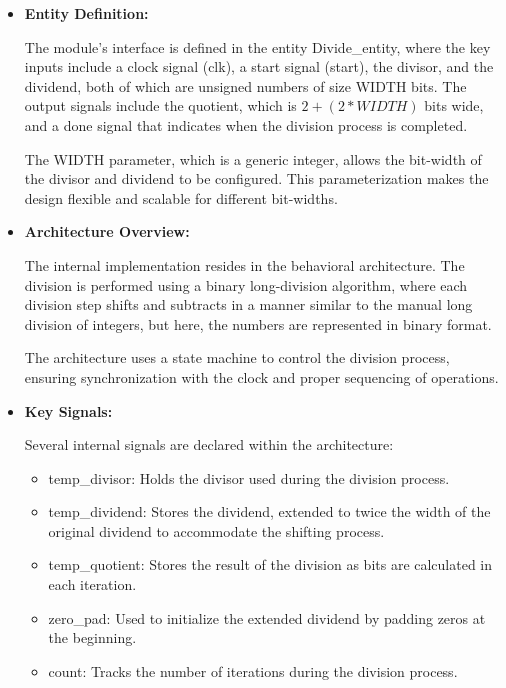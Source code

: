 \begin{itemize}
\item[$\rightarrow$]\textbf{Entity Definition:}

The module's interface is defined in the entity Divide\_entity, where the key inputs include a clock signal (clk), a start signal (start), the divisor, and the dividend, both of which are unsigned numbers of size WIDTH bits. The output signals include the quotient, which is $ 2 + (2 * WIDTH)$ bits wide, and a done signal that indicates when the division process is completed.

The WIDTH parameter, which is a generic integer, allows the bit-width of the divisor and dividend to be configured. This parameterization makes the design flexible and scalable for different bit-widths.

\item[$\rightarrow$]\textbf{Architecture Overview:}

The internal implementation resides in the behavioral architecture. The division is performed using a binary long-division algorithm, where each division step shifts and subtracts in a manner similar to the manual long division of integers, but here, the numbers are represented in binary format.

The architecture uses a state machine to control the division process, ensuring synchronization with the clock and proper sequencing of operations.

\item[$\rightarrow$]\textbf{Key Signals:}

Several internal signals are declared within the architecture:

\begin{itemize}
	\item[$\bullet$]  temp\_divisor: Holds the divisor used during the division process.
	\item[$\bullet$]  temp\_dividend: Stores the dividend, extended to twice the width of the original dividend to accommodate the shifting process.
	\item[$\bullet$]  temp\_quotient: Stores the result of the division as bits are calculated in each iteration.
	\item[$\bullet$]  zero\_pad: Used to initialize the extended dividend by padding zeros at the beginning.
	\item[$\bullet$]  count: Tracks the number of iterations during the division process. 
\end{itemize}


\end{itemize}
